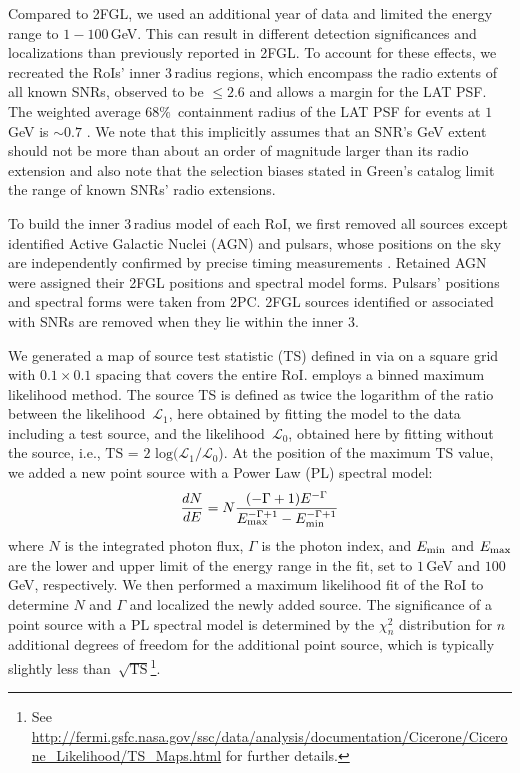 {%
Compared to 2FGL, we used an additional year of data and limited the energy range to $1-100$\,GeV. This can result in different detection significances and localizations than previously reported in 2FGL. To account for these effects, we recreated the RoIs' inner $3$\degr{}\,radius regions, which encompass the radio extents of all known SNRs, observed to be $\leq 2.6$\degr{} and allows a margin for the LAT PSF. 
The weighted average $68\%$~containment radius of the LAT PSF for %
events at $1$\,GeV is $\sim0.7$\degr{} \citep{lat_cm}. 
We note that this implicitly assumes that an SNR's GeV extent should not be more than about an order of magnitude larger than its radio extension and also note that the selection biases stated in Green's catalog limit the range of known SNRs' radio extensions. 

To build the inner $3$\degr{}\,radius model of each RoI, we first removed all sources except identified Active Galactic Nuclei (AGN) and pulsars, whose positions on the sky are independently confirmed by precise timing measurements \citep{2PC}. Retained AGN were assigned their 2FGL positions and spectral model forms. Pulsars' positions and spectral forms were taken from 2PC. 2FGL sources identified or associated with SNRs are removed when they lie within the inner $3$\degr{}. %

We generated a map of source test statistic (TS) defined in \citet{Mattox96} via \ptlike{} on a square grid with $0.1$\degr{}\,$\times$\,$0.1$\degr{} spacing that covers the entire RoI. \ptlike{} employs a binned maximum likelihood method. The source TS is defined as twice the logarithm of the ratio between the likelihood~$\mathcal{L}_1$, here obtained by fitting the model to the data including a test source, and the likelihood~$\mathcal{L}_0$, obtained here by fitting without the source, i.e., $\textrm{TS = 2 log}(\mathcal{L}_1/\mathcal{L}_0$). At the position of the maximum TS value, we added a new point source with a Power Law (PL) spectral model:
\begin{equation}
	\label{eqn:PL}
	\frac{dN}{dE} = N\frac{(-\Gamma+1)E^{-\Gamma}} {E_{\rm max}^{-\Gamma+1} - E_{\rm min}^{-\Gamma+1}}
\end{equation}
where $N$ is the integrated photon flux, $\Gamma$ is the photon index, and $E_{\rm min}$ and $E_{\rm max}$ are the lower and upper limit of the energy range in the fit, set to $1$\,GeV and $100$\,GeV, respectively.
We then performed a maximum likelihood fit of the RoI to determine $N$ and $\Gamma$ and localized the newly added source. 
The significance of a point source with a PL spectral model is determined by the $\chi^2_n$ distribution for $n$ additional degrees of freedom for the additional point source, which is typically slightly less than~$\sqrt{\textrm{TS}}$\footnote{See \url{http://fermi.gsfc.nasa.gov/ssc/data/analysis/documentation/Cicerone/Cicerone_Likelihood/TS_Maps.html} for further details.}.

}
